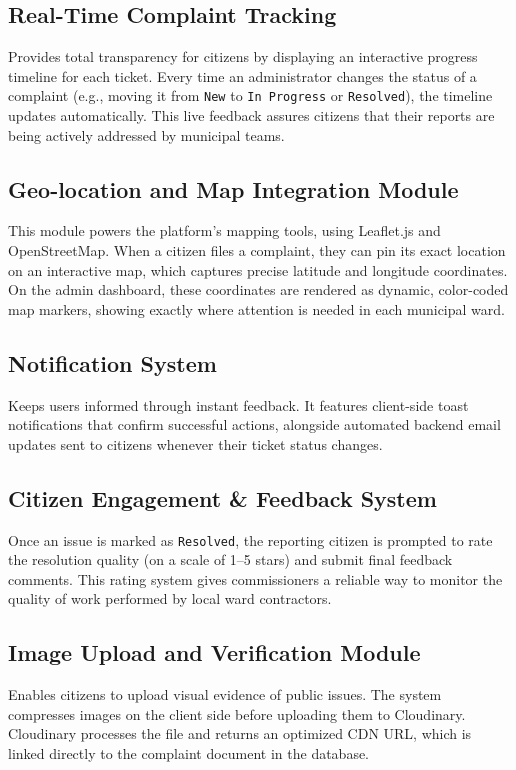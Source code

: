 \documentclass[conference]{IEEEtran}
\begin{document}
\subsection{Real-Time Complaint Tracking}
Provides total transparency for citizens by displaying an interactive progress timeline for each ticket. Every time an administrator changes the status of a complaint (e.g., moving it from \texttt{New} to \texttt{In Progress} or \texttt{Resolved}), the timeline updates automatically. This live feedback assures citizens that their reports are being actively addressed by municipal teams.

\subsection{Geo-location and Map Integration Module}
This module powers the platform's mapping tools, using Leaflet.js and OpenStreetMap. When a citizen files a complaint, they can pin its exact location on an interactive map, which captures precise latitude and longitude coordinates. On the admin dashboard, these coordinates are rendered as dynamic, color-coded map markers, showing exactly where attention is needed in each municipal ward.

\subsection{Notification System}
Keeps users informed through instant feedback. It features client-side toast notifications that confirm successful actions, alongside automated backend email updates sent to citizens whenever their ticket status changes.

\subsection{Citizen Engagement \& Feedback System}
Once an issue is marked as \texttt{Resolved}, the reporting citizen is prompted to rate the resolution quality (on a scale of 1--5 stars) and submit final feedback comments. This rating system gives commissioners a reliable way to monitor the quality of work performed by local ward contractors.

\subsection{Image Upload and Verification Module}
Enables citizens to upload visual evidence of public issues. The system compresses images on the client side before uploading them to Cloudinary. Cloudinary processes the file and returns an optimized CDN URL, which is linked directly to the complaint document in the database.
\end{document}

